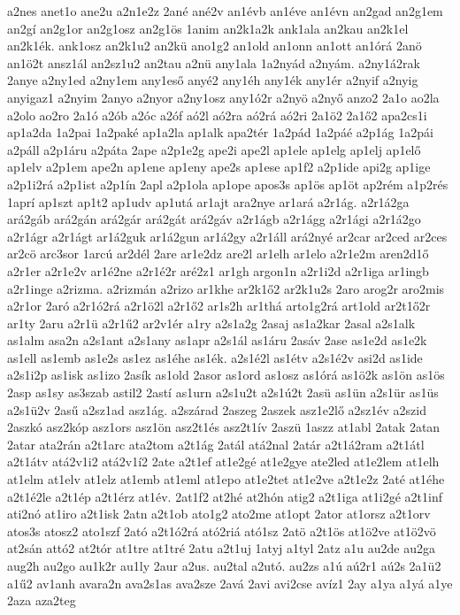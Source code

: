 {a2nes
anet1o
ane2u
a2n1e2z
2ané
ané2v
an1évb
an1éve
an1évn
an2gad
an2g1em
an2gí
an2g1or
an2g1osz
an2g1ös
1anim
an2k1a2k
ank1ala
an2kau
an2k1el
an2k1ék.
ank1osz
an2k1u2
an2kü
ano1g2
an1old
an1onn
an1ott
an1órá
2anö
an1ö2t
ansz1ál
an2sz1u2
an2tau
a2nü
any1ala
1a2nyád
a2nyám.
a2ny1á2rak
2anye
a2ny1ed
a2ny1em
any1eső
anyé2
any1éh
any1ék
any1ér
a2nyif
a2nyig
anyigaz1
a2nyim
2anyo
a2nyor
a2ny1osz
any1ó2r
a2nyö
a2nyő
anzo2
2a1o
ao2la
a2olo
ao2ro
2a1ó
a2ób
a2óc
a2óf
aó2l
aó2ra
aó2rá
aó2ri
2a1ö2
2a1ő2
apa2cs1i
ap1a2da
1a2pai
1a2paké
ap1a2la
ap1alk
apa2tér
1a2pád
1a2páé
a2p1ág
1a2pái
a2páll
a2p1áru
a2páta
2ape
a2p1e2g
ape2i
ape2l
ap1ele
ap1elg
ap1elj
ap1elő
ap1elv
a2p1em
ape2n
ap1ene
ap1eny
ape2s
ap1ese
ap1f2
a2p1ide
api2g
ap1ige
a2p1i2rá
a2p1ist
a2p1ín
2apl
a2p1ola
ap1ope
apos3s
ap1ös
ap1öt
ap2rém
a1p2rés
1aprí
ap1szt
ap1t2
ap1udv
ap1utá
ar1ajt
ara2nye
ar1ará
a2r1ág.
a2r1á2ga
ará2gáb
ará2gán
ará2gár
ará2gát
ará2gáv
a2r1ágb
a2r1ágg
a2r1ági
a2r1á2go
a2r1ágr
a2r1ágt
ar1á2guk
ar1á2gun
ar1á2gy
a2r1áll
ará2nyé
ar2car
ar2ced
ar2ces
ar2cö
arc3sor
1arcú
ar2dél
2are
ar1e2dz
are2l
ar1elh
ar1elo
a2r1e2m
aren2d1ő
a2r1er
a2r1e2v
ar1é2ne
a2r1é2r
aré2z1
ar1gh
argon1n
a2r1i2d
a2r1iga
ar1ingb
a2r1inge
a2rizma.
a2rizmán
a2rizo
ar1khe
ar2k1ő2
ar2k1u2s
2aro
arog2r
aro2mis
a2r1or
2aró
a2r1ó2rá
a2r1ö2l
a2r1ő2
ar1s2h
ar1thá
arto1g2rá
art1old
ar2t1ő2r
ar1ty
2aru
a2r1ü
a2r1ű2
ar2v1ér
a1ry
a2s1a2g
2asaj
as1a2kar
2asal
a2s1alk
as1alm
asa2n
a2s1ant
a2s1any
as1apr
a2s1ál
as1áru
2asáv
2ase
as1e2d
as1e2k
as1ell
as1emb
as1e2s
as1ez
as1éhe
as1ék.
a2s1é2l
as1étv
a2s1é2v
asi2d
as1ide
a2s1i2p
as1isk
as1izo
2asík
as1old
2asor
as1ord
as1osz
as1órá
as1ö2k
as1ön
as1ös
2asp
as1sy
as3szab
astil2
2astí
as1urn
a2s1u2t
a2s1ú2t
2asü
as1ün
a2s1ür
as1üs
a2s1ü2v
2asű
a2sz1ad
asz1ág.
a2szárad
2aszeg
2aszek
asz1e2lő
a2sz1év
a2szid
2aszkó
asz2kóp
asz1ors
asz1ön
asz2t1és
asz2t1ív
2aszü
1aszz
at1abl
2atak
2atan
2atar
ata2rán
a2t1arc
ata2tom
a2t1ág
2atál
atá2nal
2atár
a2t1á2ram
a2t1átl
a2t1átv
atá2v1i2
atá2v1í2
2ate
a2t1ef
at1e2gé
at1e2gye
ate2led
at1e2lem
at1elh
at1elm
at1elv
at1elz
at1emb
at1eml
at1epo
at1e2tet
at1e2ve
a2t1e2z
2até
at1éhe
a2t1é2le
a2t1ép
a2t1érz
at1év.
2at1f2
at2hé
at2hón
atig2
a2t1iga
at1i2gé
a2t1inf
ati2nó
at1iro
a2t1isk
2atn
a2t1ob
ato1g2
ato2me
at1opt
2ator
at1orsz
a2t1orv
atos3s
atosz2
ato1szf
2ató
a2t1ó2rá
ató2riá
ató1sz
2atö
a2t1ös
at1ö2ve
at1ö2vö
at2sán
attó2
at2tór
at1tre
at1tré
2atu
a2t1uj
1atyj
a1tyl
2atz
a1u
au2de
au2ga
aug2h
au2go
au1k2r
au1ly
2aur
a2us.
au2tal
a2utó.
au2zs
a1ú
aú2r1
aú2s
2a1ü2
a1ű2
av1anh
avara2n
ava2s1as
ava2sze
2avá
2avi
avi2cse
avíz1
2ay
a1ya
a1yá
a1ye
2aza
aza2teg
}
